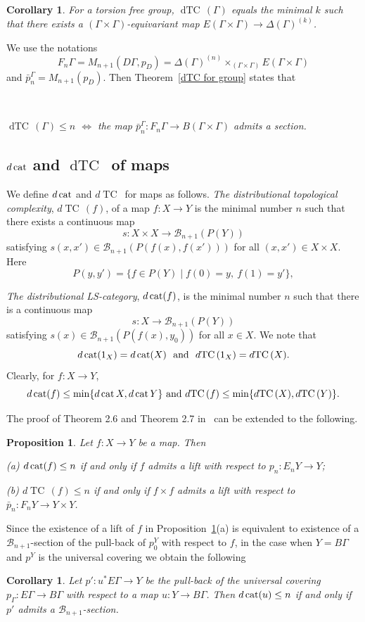 \documentclass{amsart}
\numberwithin{equation}{section}
\theoremstyle{plain}
\newtheorem{cor}[thm]{Corollary}
\newtheorem{prop}[thm]{Proposition}
\theoremstyle{definition}
\def\TC{{\mathop\mathrm{TC}\,}}
\def\dTC{{\mathop\mathrm{dTC}\,}}
\def\cat{\protect\operatorname{cat}}
\begin{document}
\begin{cor}\label{charact}
For a torsion free group, $\dTC(\Gamma)$  equals the minimal $k$ such that there exists a $(\Gamma\times\Gamma)$-equivariant map $E(\Gamma\times\Gamma)\to\Delta(\Gamma)^{(k)}$.
\end{cor}

We use the notations $$F_n\Gamma=M_{n+1}(D\Gamma,p_D)=\Delta(\Gamma)^{(n)}\times_{(\Gamma\times\Gamma)}E(\Gamma\times\Gamma)$$ and $\bar p^\Gamma_n=M_{n+1}(p_D)$. Then Theorem~\ref{dTC for group} states that

\

{\em $\dTC(\Gamma)\le n$ $\Leftrightarrow$ the  map $\bar p_n^\Gamma:F_n\Gamma\to B(\Gamma\times\Gamma)$ admits a section.}

\subsection{$d\cat$ and $\dTC$ of maps}
We define  $d\cat$ and $d\TC$ for  maps as follows. {\em The distributional topological complexity}, $d\TC(f)$, of a map $f:X\to Y$ is the minimal number $n$ such that there exists a continuous map
$$s:X\times X\to\mathcal B_{n+1}(P(Y))$$ satisfying $s(x,x')\in\mathcal B_{n+1}(P(f(x),f(x')))$ for all $(x,x')\in X\times X$.
Here $$P(y,y')=\{f\in P(Y)\mid f(0)=y,\ f(1)=y'\},$$

{\em The distributional LS-category}, $d\cat(f)$,  is the minimal number $n$ such that there is a continuous map $$s:X\to \mathcal B_{n+1}(P(Y))$$ satisfying $s(x)\in \mathcal B_{n+1}(P(f(x),y_0))$ for all $x \in X$. We note that $$d\cat(1_X)=d\cat(X)\ \ \text{and}\ \ d\TC(1_X)=d\TC(X).$$ Clearly, for $f:X\to Y$,
\begin{equation}\label{dcat of maps}
d\cat(f)\le\min\{d\cat X, d\cat Y\}\  \text{and} \ d\TC(f)\le\min\{d\TC(X),d\TC(Y)\}.
\end{equation}


The proof of Theorem 2.6 and Theorem 2.7 in~\cite{DJ} can be extended to the following.
\begin{prop}\label{liftD}
Let $f:X\to Y$ be a map. Then

(a)   $d\cat(f)\le n$ if and only if $f$ admits a lift with respect to $p_n:E_nY\to Y$;

(b) $d\TC(f)\le n$ if and only if $f\times f$  admits a lift with respect to $\bar p_n:F_nY\to Y\times Y$.
\end{prop}
Since the existence of a lift of $f$ in Proposition~\ref{liftD}(a) is equivalent to existence of a $\mathcal B_{n+1}$-section of the pull-back of $p_0^Y$ with respect to $f$,
in the case when $Y=B\Gamma$ and $p^Y$ is the universal covering we obtain the following
\begin{cor}\label{Lift}
Let $p':u^*E\Gamma\to Y$ be the pull-back of the universal covering $p_\Gamma:E\Gamma\to B\Gamma$ with respect to a map $u:Y\to B\Gamma$.
Then $d\cat(u)\le n$ if and only if $p'$ admits a $\mathcal B_{n+1}$-section.
\end{cor}
\end{document}
